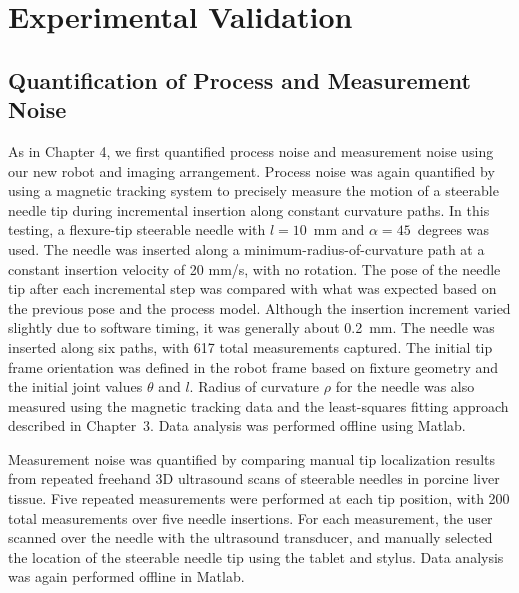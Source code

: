 \section{Experimental Validation}
\label{sec:HumanInTheLoopValidation}
\subsection{Quantification of Process and Measurement Noise}
As in Chapter 4, we first quantified process noise and measurement noise using our new robot and imaging arrangement. Process noise was again quantified by using a magnetic tracking system to precisely measure the motion of a steerable needle tip during incremental insertion along constant curvature paths. In this testing, a flexure-tip steerable needle with $l = 10$~mm and $\alpha = 45$~degrees was used. The needle was inserted along a minimum-radius-of-curvature path at a constant insertion velocity of 20 mm/s, with no rotation. The pose of the needle tip after each incremental step was compared with what was expected based on the previous pose and the process model. Although the insertion increment varied slightly due to software timing, it was generally about 0.2~mm. The needle was inserted along six paths, with 617 total measurements captured. The initial tip frame orientation was defined in the robot frame based on fixture geometry and the initial joint values $\theta$ and $l$. Radius of curvature $\rho$ for the needle was also measured using the magnetic tracking data and the least-squares fitting approach described in Chapter~3. Data analysis was performed offline using Matlab. 

Measurement noise was quantified by comparing manual tip localization results from repeated freehand 3D ultrasound scans of steerable needles in porcine liver tissue. Five repeated measurements were performed at each tip position, with 200 total measurements over five needle insertions. For each measurement, the user scanned over the needle with the ultrasound transducer, and manually selected the location of the steerable needle tip using the tablet and stylus. Data analysis was again performed offline in Matlab.

